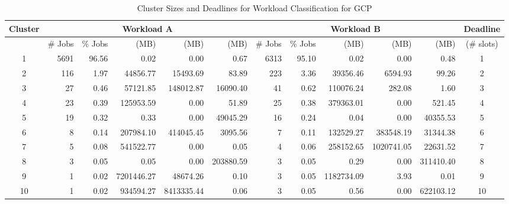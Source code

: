 \documentclass[10pt,conference,compsocconf,letterpaper]{IEEEtran}
\begin{document}
\begin{table*}[!t]
  \centering
  \caption{Cluster Sizes and Deadlines for Workload Classification for GCP}
   \begin{tabular}{c|r|r|r|r|r|r|r|r|r|r|c}
    \hline \hline
    Cluster & \multicolumn{5}{c|}{Workload A}        & \multicolumn{5}{c|}{Workload B}        & Deadline \\
    \hline
          & \# Jobs & \% Jobs &  (MB) &  (MB) &  (MB) & \# Jobs & \% Jobs &  (MB) &  (MB) &  (MB) & (\# slots) \\ \hline
    1     & 5691  & 96.56 & 0.02  & 0.00  & 0.67  & 6313  & 95.10 & 0.02  & 0.00  & 0.48  & 1 \\
    2     & 116   & 1.97  & 44856.77 & 15493.69 & 83.89 & 223   & 3.36  & 39356.46 & 6594.93 & 99.26 & 2 \\
    3     & 27    & 0.46  & 57121.85 & 148012.87 & 16090.40 & 41    & 0.62  & 110076.24 & 282.08 & 1.60  & 3 \\
    4     & 23    & 0.39  & 125953.59 & 0.00  & 51.89 & 25    & 0.38  & 379363.01 & 0.00  & 521.45 & 4 \\
    5     & 19    & 0.32  & 0.33  & 0.00  & 49045.29 & 16    & 0.24  & 0.04  & 0.00  & 40355.53 & 5 \\
    6     & 8     & 0.14  & 207984.10 & 414045.45 & 3095.56 & 7     & 0.11  & 132529.27 & 383548.19 & 31344.38 & 6 \\
    7     & 5     & 0.08  & 541522.77 & 0.00  & 0.05  & 4     & 0.06  & 258152.65 & 1020741.05 & 22631.52 & 7 \\
    8     & 3     & 0.05  & 0.05  & 0.00  & 203880.59 & 3     & 0.05  & 0.29  & 0.00  & 311410.40 & 8 \\
    9     & 1     & 0.02  & 7201446.27 & 48674.26 & 0.10  & 3     & 0.05  & 1182734.09 & 3.93  & 0.01  & 9 \\
    10    & 1     & 0.02  & 934594.27 & 8413335.44 & 0.06  & 3     & 0.05  & 0.56  & 0.00  & 622103.12 & 10 \\
    \hline
    \end{tabular}\label{table:gcp}\end{table*}
\end{document}
